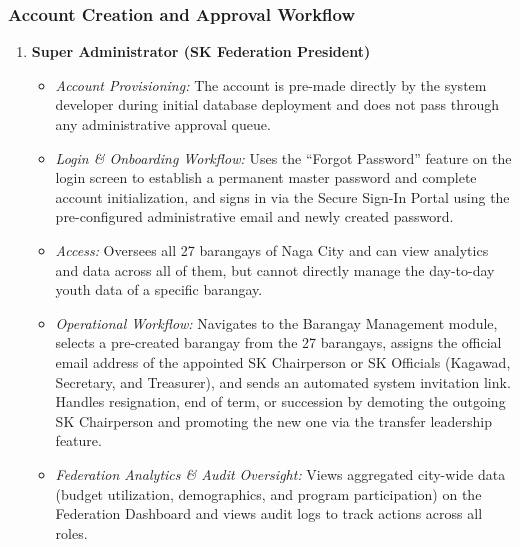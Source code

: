 \subsubsection{Account Creation and Approval Workflow}
\label{subsubsec:account_creation_approval_workflow}

\begin{enumerate}
    \item \textbf{Super Administrator (SK Federation President)}
    \begin{itemize}
        \item \textit{Account Provisioning:} The account is pre-made directly by the system developer during initial database deployment and does not pass through any administrative approval queue.
        \item \textit{Login \& Onboarding Workflow:} Uses the ``Forgot Password'' feature on the login screen to establish a permanent master password and complete account initialization, and signs in via the Secure Sign-In Portal using the pre-configured administrative email and newly created password.
        \item \textit{Access:} Oversees all 27 barangays of Naga City and can view analytics and data across all of them, but cannot directly manage the day-to-day youth data of a specific barangay.
        \item \textit{Operational Workflow:} Navigates to the Barangay Management module, selects a pre-created barangay from the 27 barangays, assigns the official email address of the appointed SK Chairperson or SK Officials (Kagawad, Secretary, and Treasurer), and sends an automated system invitation link. Handles resignation, end of term, or succession by demoting the outgoing SK Chairperson and promoting the new one via the transfer leadership feature.
        \item \textit{Federation Analytics \& Audit Oversight:} Views aggregated city-wide data (budget utilization, demographics, and program participation) on the Federation Dashboard and views audit logs to track actions across all roles.
    \end{itemize}


\end{enumerate}
